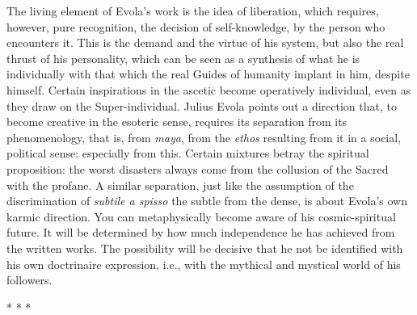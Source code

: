 The living element of Evola's work is the idea of liberation, which requires, however, pure recognition, the decision of self-knowledge, by the person who encounters it. This is the demand and the virtue of his system, but also the real thrust of his personality, which can be seen as a synthesis of what he is individually with that which the real Guides of humanity implant in him, despite himself. Certain inspirations in the ascetic become operatively individual, even as they draw on the Super-individual. Julius Evola points out a direction that, to become creative in the esoteric sense, requires its separation from its phenomenology, that is, from \emph{maya}, from the \emph{ethos} resulting from it in a social, political sense: especially from this. Certain mixtures betray the spiritual proposition: the worst disasters always come from the collusion of the Sacred with the profane. A similar separation, just like the assumption of the discrimination of
\emph{subtile a spisso} the subtle from the dense, is about Evola's own karmic direction. You can metaphysically become aware of his cosmic-spiritual future. It will be determined by how much independence he has achieved from the written works. The possibility will be decisive that he not be identified with his own doctrinaire expression, i.e., with the mythical and mystical world of his followers.




\begin{center}* * *\end{center}

